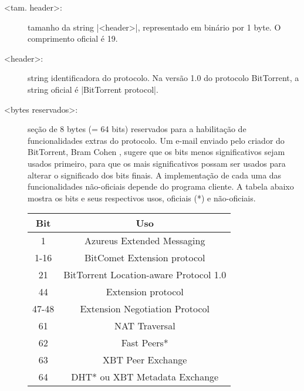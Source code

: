 \begin{description}
    \item[<tam. header>:] tamanho da string \bverb|<header>|, representado em binário
        por 1 byte. O comprimento oficial é 19.

    \item[<header>:] \gls*{string} identificadora do protocolo. Na versão 1.0 do
        protocolo BitTorrent, a \gls*{string} oficial é \sverb|BitTorrent protocol|.

    \item[<bytes reservados>:] seção de 8 bytes (= 64 bits) reservados para a
        habilitação de funcionalidades extras do protocolo. Um e-mail enviado pelo
        criador do BitTorrent, Bram Cohen \cite{wikitheory:reserved-bytes}, sugere que
        os bits menos significativos sejam usados primeiro, para que os mais
        significativos possam ser usados para alterar o significado dos bits finais. A
        implementação de cada uma das funcionalidades não-oficiais depende do programa
        cliente. A tabela abaixo mostra os bits e seus respectivos usos, oficiais (*)
        e não-oficiais.

        \begin{center}
            \begin{tabular}{ | c | c |}
            \hline
            \textbf{Bit} & \textbf{Uso}                         \\ \hline
            1       & Azureus Extended Messaging                \\ \hline
            1-16    & BitComet Extension protocol               \\ \hline
            21      & BitTorrent Location-aware Protocol 1.0    \\ \hline
            44      & Extension protocol                        \\ \hline
            47-48   & Extension Negotiation Protocol            \\ \hline
            61      & NAT Traversal                             \\ \hline
            62      & Fast Peers*                               \\ \hline
            63      & XBT Peer Exchange                         \\ \hline
            64      & DHT* ou XBT Metadata Exchange             \\ \hline
            \end{tabular}
        \end{center}


\end{description}
